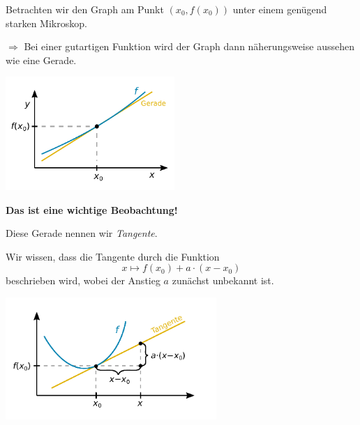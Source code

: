 \documentclass[9pt]{beamer}
\newcommand{\strong}[1]{\textsf{\textbf{#1}}}
\begin{document}
\begin{frame}[t]
\vspace{2em}
Betrachten wir den Graph am Punkt $(x_0,f(x_0))$ unter einem
genügend starken Mikroskop.\pause

\vspace{0.5em}
$\Longrightarrow$ Bei einer gutartigen Funktion wird der Graph dann
näherungsweise aussehen wie eine Gerade.\pause

\begin{center}
\includegraphics[width=64mm]{img/Funktion-Tangente.pdf}
\end{center}
\end{frame}

\begin{frame}
\strong{Das ist eine wichtige Beobachtung!}\pause

\vspace{0.8em}
Diese Gerade nennen wir \emph{Tangente}.
\end{frame}

\begin{frame}[t]
\vspace{2.4em}
Wir wissen, dass die Tangente durch die Funktion
\[x\mapsto f(x_0)+a\cdot (x-x_0)\]
beschrieben wird, wobei der Anstieg $a$ zunächst
unbekannt ist.\pause

\vspace{-0.8em}
\begin{center}
\includegraphics[width=80mm]{img/Tangente.pdf}
\end{center}
\end{frame}
\end{document}

